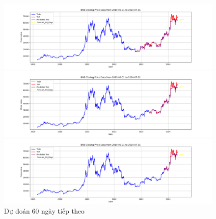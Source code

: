 \documentclass[conference]{IEEEtran}
\begin{document}
	\begin{figure}[H]
		\centering
		\begin{minipage}{0.15\textwidth}
			\centering
			\includegraphics[width=1\textwidth]{Figure/RandomForest_BTC_60days_73.png}
		\end{minipage}
		\hfill
		\begin{minipage}{0.15\textwidth}
			\centering
			\includegraphics[width=1\textwidth]{Figure/RandomForest_BTC_60days_82.png}
		\end{minipage}
		\hfill
		\begin{minipage}{0.15\textwidth}
			\centering
			\includegraphics[width=1\textwidth]{Figure/RandomForest_BTC_60days_91.png}
		\end{minipage}
		\caption{Dự đoán 60 ngày tiếp theo}
		\label{fig:1}
	\end{figure}
	
\end{document}
